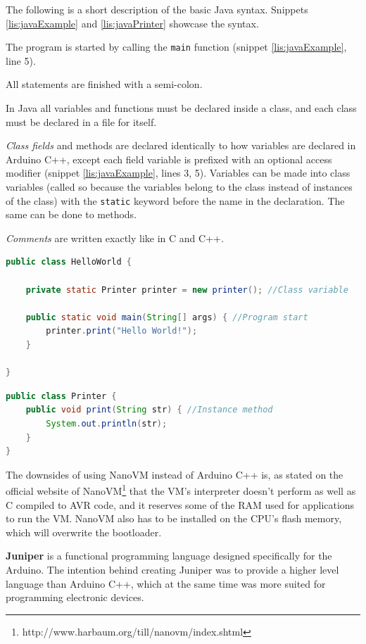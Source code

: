 The following is a short description of the basic Java syntax. 
Snippets \ref{lis:javaExample} and \ref{lis:javaPrinter} showcase the syntax.

The program is started by calling the \texttt{main} function (snippet \ref{lis:javaExample}, line 5).

All statements are finished with a semi-colon.

In Java all variables and functions must be declared inside a class, and each class must be declared in a file for itself.

\textit{Class fields} and methods are declared identically to how variables are declared in Arduino C++, except each field variable is prefixed with an optional access modifier (snippet \ref{lis:javaExample}, lines 3, 5).
Variables can be made into class variables (called so because the variables belong to the class instead of instances of the class) with the \texttt{static} keyword before the name in the declaration.
The same can be done to methods.

\textit{Comments} are written exactly like in C and C++.

\begin{lstlisting}[language=Java,label=lis:javaExample,caption=An example program written in Java.,firstnumber=1]
public class HelloWorld {

	private static Printer printer = new printer(); //Class variable
	
	public static void main(String[] args) { //Program start
		printer.print("Hello World!");
	}
	
}
\end{lstlisting}

\begin{lstlisting}[language=Java,label=lis:javaPrinter,caption=Printer class with one method written in Java.,firstnumber=1]
public class Printer {
	public void print(String str) { //Instance method
		System.out.println(str);
	}
}
\end{lstlisting}

The downsides of using NanoVM instead of Arduino C++ is, as stated on the official website of NanoVM\footnote{http://www.harbaum.org/till/nanovm/index.shtml} that the VM's interpreter doesn't perform as well as C compiled to AVR code, and it reserves some of the RAM used for applications to run the VM.
NanoVM also has to be installed on the CPU's flash memory, which will overwrite the bootloader.

\textbf{Juniper} is a functional programming language designed specifically for the Arduino.
The intention behind creating Juniper was to provide a higher level language than Arduino C++, which at the same time was more suited for programming electronic devices\cite{JuniperTutorial}.

